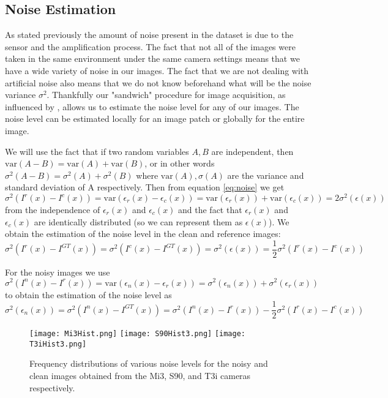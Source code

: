 \documentclass[review]{elsarticle}
\newcommand{\var}{\text{var}}
\begin{document}
\subsection{Noise Estimation}\label{sec:noiseeq}


As stated previously the amount of noise present in the dataset is due to the sensor and the amplification process. The fact that not all of the images were taken in the same environment under the same camera settings means that we have a wide variety of noise in our images. The fact that we are not dealing with artificial noise  also means that we do not know beforehand what will be the noise variance $\sigma^2$. Thankfully our "sandwich" procedure for image acquisition, as influenced by \cite{RadiometricCCD,NoiseEstimation}, allows us to estimate the noise level for any of our images. The noise level can be estimated locally for an image patch or globally for the entire image.

We will use the fact that if two random variables $A,B$ are independent, then $\var(A-B)=\var(A)+\var(B)$, or in other words $\sigma^2(A-B)=\sigma^2(A)+\sigma^2(B)$ where $\var(A), \sigma(A)$ are the variance and standard deviation of A respectively.
Then  from equation \eqref{eq:noise} we get
\[\sigma^2(I^r(x)-I^c(x))=\var(\epsilon_r(x)-\epsilon_c(x))=\var(\epsilon_r(x))+\var(\epsilon_c(x))=2\sigma^2(\epsilon(x))\]
from the independence of $\epsilon_r(x)$ and $\epsilon_c(x)$ and the fact that $\epsilon_r(x)$ and $\epsilon_c(x)$ are identically distributed (so we can represent them as $\epsilon(x)$). We obtain the estimation of the noise level in the clean and reference images:
\begin{equation}
\sigma^2(I^r(x)-I^{GT}(x))=\sigma^2(I^c(x)-I^{GT}(x))=\sigma^2(\epsilon(x))=\frac{1}{2}\sigma^2(I^r(x)-I^c(x)) \label{eq:noiseclean}
\end{equation}

For the noisy images we use 
\[\sigma^2(I^n(x)-I^r(x))=\var(\epsilon_n(x)-\epsilon_r(x))=\sigma^2(\epsilon_n(x))+\sigma^2(\epsilon_r(x))\]
to obtain the estimation of the noise level as
\begin{equation}
\sigma^2(\epsilon_n(x))=\sigma^2(I^n(x)-I^{GT}(x))=\sigma^2(I^n(x)-I^r(x))-\frac{1}{2}\sigma^2(I^r(x)-I^c(x)) \label{eq:noiselevel}
\end{equation}
\begin{figure*}[t]
\centering
\hspace{-3mm}\texttt{[image: Mi3Hist.png]}
\hspace{-3mm}\texttt{[image: S90Hist3.png]}
\hspace{-3mm}\texttt{[image: T3iHist3.png]}
\vskip -4mm
\caption{Frequency distributions of various noise levels for the noisy and clean images obtained from the Mi3, S90, and T3i  cameras respectively. }
\label{fig:hists}
\vspace {-4mm}
\end{figure*}
\end{document}
